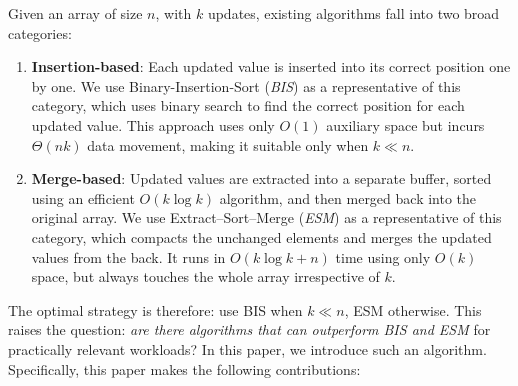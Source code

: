 

Given an array of size $n$, with $k$ updates, existing algorithms fall into two broad categories:
\begin{enumerate}
  \item \textbf{Insertion-based}: Each updated value is inserted into its correct position one by one. We use Binary-Insertion-Sort (\emph{BIS}) as a representative of this category, which uses binary search to find the correct position for each updated value. This approach uses only $O(1)$ auxiliary space but incurs $\Theta(nk)$ data movement, making it suitable only when $k \ll n$.
  \item \textbf{Merge-based}: Updated values are extracted into a separate buffer, sorted using an efficient $O(k \log k)$ algorithm, and then merged back into the original array. We use Extract–Sort–Merge (\emph{ESM}) as a representative of this category, which compacts the unchanged elements and merges the updated values from the back. It runs in $O(k \log k + n)$ time using only $O(k)$ space, but always touches the whole array irrespective of $k$.
\end{enumerate}

The optimal strategy is therefore: use BIS when $k \ll n$, ESM otherwise. This raises the question: \emph{are there algorithms that can outperform BIS and ESM} for practically relevant workloads? In this paper, we introduce such an algorithm. Specifically, this paper makes the following contributions:

